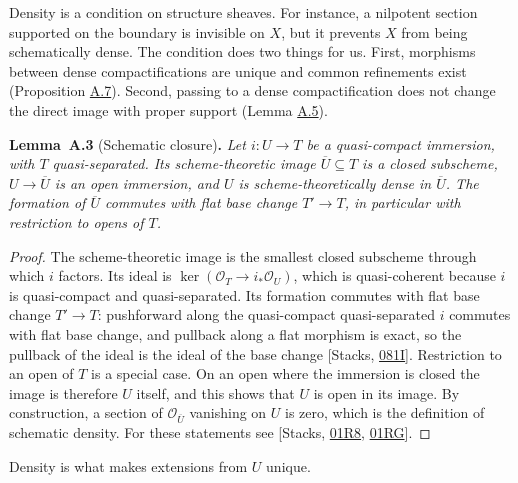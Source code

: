 \documentclass[11pt]{article}
\newenvironment{bpstatement}[2]{\par\addvspace{0.6\baselineskip}\noindent\textbf{#1}#2\textbf{.}\enspace\ignorespaces}
  {\par\addvspace{0.4\baselineskip}}
\newenvironment{bpstatementit}[2]{\begin{bpstatement}{#1}{#2}\itshape\ignorespaces}{\end{bpstatement}}
\begin{document}
Density is a condition on structure sheaves. For instance, a nilpotent section supported on the boundary is invisible on \(X\), but it prevents \(X\) from being schematically dense. The condition does two things for us. First, morphisms between dense compactifications are unique and common refinements exist (Proposition \hyperref[bp19]{A.7}). Second, passing to a dense compactification does not change the direct image with proper support (Lemma \hyperref[bp15]{A.5}).

\label{bp9}%
\begin{bpstatementit}{Lemma~A.3}{ (Schematic closure)}
Let \(i:U\to T\) be a quasi-compact immersion, with \(T\) quasi-separated. Its scheme-theoretic image \(\overline U\subseteq T\) is a closed subscheme, \(U\to\overline U\) is an open immersion, and \(U\) is scheme-theoretically dense in \(\overline U\). The formation of \(\overline U\) commutes with flat base change \(T'\to T\), in particular with restriction to opens of \(T\).
\end{bpstatementit}

\begin{proof}[{Proof}]\label{bp10}%
The scheme-theoretic image is the smallest closed subscheme through which \(i\) factors. Its ideal is \(\ker(\mathcal O_T\to i_*\mathcal O_U)\), which is quasi-coherent because \(i\) is quasi-compact and quasi-separated. Its formation commutes with flat base change \(T'\to T\): pushforward along the quasi-compact quasi-separated \(i\) commutes with flat base change, and pullback along a flat morphism is exact, so the pullback of the ideal is the ideal of the base change [Stacks, \href{https://stacks.math.columbia.edu/tag/081I}{081I}]. Restriction to an open of \(T\) is a special case. On an open where the immersion is closed the image is therefore \(U\) itself, and this shows that \(U\) is open in its image. By construction, a section of \(\mathcal O_{\overline U}\) vanishing on \(U\) is zero, which is the definition of schematic density. For these statements see [Stacks, \href{https://stacks.math.columbia.edu/tag/01R8}{01R8}, \href{https://stacks.math.columbia.edu/tag/01RG}{01RG}].
\end{proof}

\label{bp11}%
Density is what makes extensions from \(U\) unique.
\end{document}
